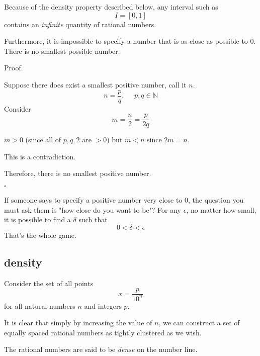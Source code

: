 \documentclass[11pt, oneside]{article}
\begin{document}
Because of the density property described below, any interval such as
\[ I = [0,1] \]
contains an \emph{infinite} quantity of rational numbers.

Furthermore, it is impossible to specify a number that is as close as possible to $0$.  There is no smallest possible number.

Proof.

Suppose there does exist a smallest positive number, call it $n$.
\[ n = \frac{p}{q}, \ \ \ \ \ \ p,q \in \mathbb{N} \]
Consider 
\[ m = \frac{n}{2} = \frac{p}{2q} \]

$m > 0$ (since all of $p,q,2$ are $> 0$) but $m < n$ since $2m = n$.

This is a contradiction.

Therefore, there is no smallest positive number.

$\square$

If someone says to specify a positive number very close to $0$, the question you must ask them is "how close do you want to be"?  For any $\epsilon$, no matter how small, it is possible to find a $\delta$ such that
\[ 0 < \delta < \epsilon \]
That's the whole game.

\subsection*{density}
Consider the set of all points
\[ x = \frac{p}{10^n} \]
for all natural numbers $n$ and integers $p$.

It is clear that simply by increasing the value of $n$, we can construct a set of equally spaced rational numbers as tightly clustered as we wish.

The rational numbers are said to be \emph{dense} on the number line.  
\end{document}
